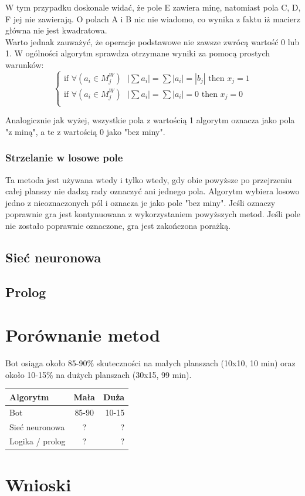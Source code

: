 \documentclass{article} %
\begin{document}
W tym przypadku doskonale widać, że pole E zawiera minę, natomiast pola C, D, F jej nie zawierają. 
O polach A i B nic nie wiadomo, co wynika z faktu iż macierz główna nie jest kwadratowa. \\
Warto jednak zauważyć, że operacje podstawowe nie zawsze zwrócą wartość 0 lub 1. W ogólności
algorytm sprawdza otrzymane wyniki za pomocą prostych warunków: 
$$
\begin{cases}
 \text{if } \forall{(a_{i} \in M_{j}^W)} \text{ } |\sum{a_{i}}| = \sum{|a_{i}| = |b_{j}|}  \text{ then } x_{j}=1 \\
 \text{if } \forall{(a_{i} \in M_{j}^W)} \text{ } |\sum{a_{i}}| = \sum{|a_{i}|} = 0 \text{ then } x_{j}=0 \\
\end{cases}
$$

Analogicznie jak wyżej, wszystkie pola z wartością 1 algorytm oznacza jako pola "z miną", a te z wartością 0 jako "bez miny".

\subsubsection{Strzelanie w losowe pole}
Ta metoda jest używana wtedy i tylko wtedy, gdy obie powyższe po przejrzeniu całej planszy
nie dadzą rady oznaczyć ani jednego pola. Algorytm wybiera losowo jedno z nieoznaczonych pól
i oznacza je jako pole "bez miny". Jeśli oznaczy poprawnie gra jest kontynuowana z wykorzystaniem
 powyższych metod. Jeśli pole nie zostało poprawnie oznaczone, gra jest zakończona porażką.

\subsection{Sieć neuronowa}
\subsection{Prolog}
\section{Porównanie metod}
Bot osiąga około 85-90\% skuteczności na małych planszach (10x10, 10 min) 
oraz około 10-15\% na dużych planszach (30x15, 99 min).
\begin{center} 
    \begin{tabular}  { | l | c | r |   }
        \hline
        Algorytm & Mała & Duża  \\
        \hline
        Bot & 85-90 & 10-15 \\
        \hline
        Sieć neuronowa & ? & ? \\
        \hline
        Logika / prolog & ? & ? \\
        \hline
    \end{tabular}
\end{center}
\section{Wnioski}
\end{document}
